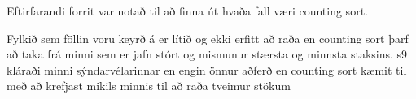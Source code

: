 Eftirfarandi forrit var notað til að finna út hvaða fall væri counting sort.

Fylkið sem föllin voru keyrð á er lítið og ekki erfitt að raða en counting sort þarf að taka frá minni sem er jafn stórt og mismunur stærsta  og minnsta staksins. s9 kláraði minni sýndarvélarinnar en engin önnur aðferð en counting sort kæmit til með að krefjast mikils minnis til að raða tveimur stökum
